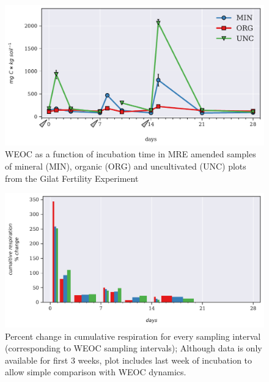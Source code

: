 			\begin{figure}[H]
				\centering
			\includegraphics[scale=0.8, width=\linewidth]{thesis_figures/main_incubation/MRE_treated/WEOC.pdf}
				\caption{WEOC as a function of incubation time in MRE amended samples of mineral (MIN), organic (ORG) and uncultivated (UNC) plots from the Gilat Fertility Experiment}
				\label{fig:weoc_treated_main}
			\end{figure}

			\begin{figure}[H]
				\centering
				\includegraphics[scale=0.8, width=\linewidth]{thesis_figures/main_incubation/MRE_treated/weoc_pct_change.pdf}
				\caption{Percent change in cumulative respiration for every sampling interval (corresponding to WEOC sampling intervals); Although data is only available for first 3 weeks, plot includes last week of incubation to allow simple comparison with WEOC dynamics.}
				\label{fig:weoc_pct_change_treated_main}
			\end{figure}


